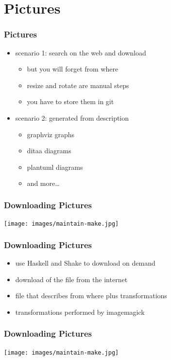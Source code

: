 \documentclass{beamer}
\begin{document}
\section{Pictures}

\begin{frame}
  \frametitle{Pictures}
  \begin{itemize}
  \item scenario 1: search on the web and download
    \begin{itemize}
    \item but you will forget from where
    \item resize and rotate are manual steps
    \item you have to store them in git
    \end{itemize}
  \item scenario 2: generated from description
    \begin{itemize}
    \item graphviz graphs
    \item ditaa diagrams
    \item plantuml diagrams
    \item and more\ldots{}
    \end{itemize}
  \end{itemize}
\end{frame}

\begin{frame}
  \frametitle{Downloading Pictures}
  \begin{center}
    \texttt{[image: images/maintain-make.jpg]}
  \end{center}
\end{frame}

\begin{frame}
  \frametitle{Downloading Pictures}
  \begin{itemize}
  \item use Haskell and Shake to download on demand
  \item download of the file from the internet
  \item file that describes from where plus transformations
  \item transformations performed by imagemagick
  \end{itemize}
\end{frame}

\begin{frame}
  \frametitle{Downloading Pictures}
  \begin{center}
    \texttt{[image: images/maintain-make.jpg]}
    \inputminted{text}{images/maintain-make.src}
  \end{center}
\end{frame}
\end{document}
